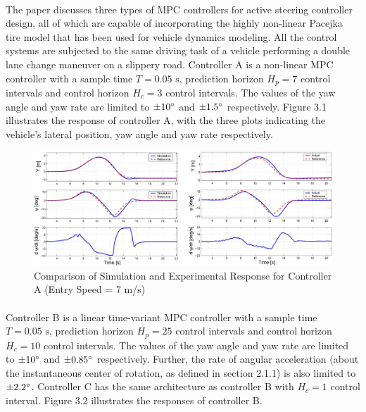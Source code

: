 \paragraph{}
The paper discusses three types of MPC controllers for active steering controller design, all of which are capable of incorporating the highly non-linear Pacejka tire model that has been used for vehicle dynamics modeling. All the control systems are subjected to the same driving task of a vehicle performing a double lane change maneuver on a slippery road. Controller A is a non-linear MPC controller with a sample time $T = 0.05\text{ s}$, prediction horizon $H_p=7$ control intervals and control horizon $H_c=3$ control intervals. The values of the yaw angle and yaw rate are limited to $\pm 10\degree$ and $\pm 1.5\degree$ respectively. Figure 3.1 illustrates the response of controller A, with the three plots indicating the vehicle's lateral position, yaw angle and yaw rate respectively.

\begin{figure}[H]\label{fig3.1}
\centering \includegraphics[width=\textwidth]{Images/paper1_controllerA_response.png}
\caption{Comparison of Simulation and Experimental Response for Controller A (Entry Speed = 7 m/s)}
\end{figure}

\paragraph{}
Controller B is a linear time-variant MPC controller with a sample time $T = 0.05\text{ s}$, prediction horizon $H_p=25$ control intervals and control horizon $H_c=10$ control intervals. The values of the yaw angle and yaw rate are limited to $\pm 10\degree$ and $\pm 0.85\degree$ respectively. Further, the rate of angular acceleration (about the instantaneous center of rotation, as defined in section 2.1.1) is also limited to $\pm 2.2\degree$. Controller C has the same architecture as controller B with $H_c = 1$ control interval. Figure 3.2 illustrates the responses of controller B.

